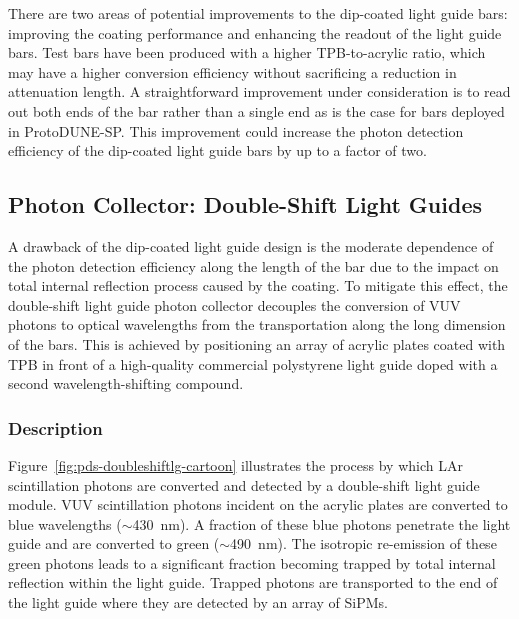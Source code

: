 
There are two areas of potential improvements to the dip-coated light guide bars: improving the coating performance and enhancing the readout of the light guide bars.  Test bars have been produced with a higher TPB-to-acrylic ratio, which may have a higher conversion efficiency without sacrificing a reduction in attenuation length.  A straightforward improvement under consideration is to read out both ends of the  bar rather than a single end as is the case for bars deployed in ProtoDUNE-SP.  This improvement could increase the photon detection efficiency of the dip-coated light guide bars by up to a factor of two.

\subsection{Photon Collector: Double-Shift Light Guides}
\label{ssec:fdsp-pd-pc-bar2}

A drawback of the dip-coated light guide design is the moderate dependence of the photon detection efficiency along the length of the bar due to the impact on total internal reflection process 
caused by the coating.  To mitigate this effect, the double-shift light guide photon collector decouples the conversion of VUV photons to optical
wavelengths from the transportation along the long dimension of the bars. This is achieved by positioning an array of acrylic plates coated with TPB in front of a high-quality commercial polystyrene light guide doped with a second wavelength-shifting compound.

\subsubsection{Description}

Figure~\ref{fig:pds-doubleshiftlg-cartoon} illustrates the process by which LAr scintillation photons are converted and detected by a double-shift light guide module. VUV scintillation photons incident on the acrylic plates are converted to blue wavelengths ($\sim$\SI{430}{nm}). A fraction of these blue photons penetrate the light guide and are converted to green ($\sim$\SI{490}{nm}). The isotropic re-emission of these green photons leads to a significant fraction becoming trapped by total internal reflection within the light guide. Trapped photons are transported to the end of the light guide where they are detected by an array of SiPMs.

